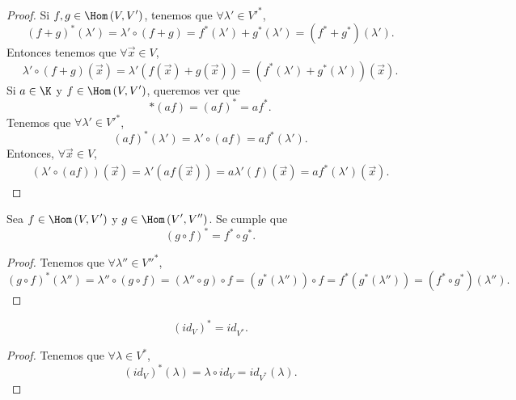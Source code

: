 \begin{proof}
Si $\displaystyle f, g \in \Hom\left(V, V'\right) $, tenemos que $\displaystyle \forall \lambda' \in V'^{*} $, 
\[\left(f+g\right)^{*}\left(\lambda'\right) = \lambda' \circ \left(f + g\right)= f^{*}\left(\lambda'\right) + g^{*}\left(\lambda'\right) = \left(f^{*}+g^{*}\right)\left(\lambda'\right) .\]
Entonces tenemos que $\displaystyle \forall \vec{x}\in V $, 
\[\lambda'\circ\left(f+g\right)\left(\vec{x}\right) = \lambda'\left(f\left(\vec{x}\right)+g\left(\vec{x}\right)\right) = \left(f^{*}\left(\lambda'\right)+g^{*}\left(\lambda'\right)\right)\left(\vec{x}\right) .\]
Si $\displaystyle a \in \K $ y $\displaystyle f \in \Hom\left(V, V'\right) $, queremos ver que
\[ *\left(af\right) = \left(af\right)^{*} = af^{*}.\]
Tenemos que $\displaystyle \forall \lambda' \in V'^{*} $, 
\[\left(af\right)^{*}\left(\lambda'\right) = \lambda' \circ \left(af\right) = a f^{*}\left(\lambda'\right) .\]
Entonces, $\displaystyle \forall \vec{x} \in V $, 
\[
\begin{split}
	\left(\lambda' \circ \left(af\right)\right)\left(\vec{x}\right) = \lambda'\left(af\left(\vec{x}\right)\right) = a \lambda'\left(f\right)\left(\vec{x}\right) = af^{*}\left(\lambda'\right)\left(\vec{x}\right) .
\end{split}
\]
\end{proof}

\begin{fprop}[]
\normalfont Sea $\displaystyle f \in \Hom\left(V, V'\right) $ y $\displaystyle g \in \Hom\left(V', V''\right) $. Se cumple que 
\[\left(g \circ f\right)^{*} = f^{*} \circ g^{*} .\]
\end{fprop}

\begin{proof}
Tenemos que $\displaystyle \forall \lambda''\in V''^{*} $, 
\[\left(g\circ f\right)^{*}\left(\lambda''\right)=\lambda''\circ\left(g\circ f\right) = \left(\lambda''\circ g\right)\circ f = \left(g^{*}\left(\lambda''\right)\right)\circ f = f^{*}\left(g^{*}\left(\lambda''\right)\right) = \left(f^{*}\circ g^{*}\right)\left(\lambda''\right) .\]
\end{proof}

\begin{fprop}[]
\normalfont 
\[\left(id _{V}\right)^{*} = id _{V^{*}} .\]
\end{fprop}

\begin{proof}
Tenemos que $\displaystyle \forall \lambda \in V^{*} $, 
\[\left(id _{V}\right)^{*}\left(\lambda\right) = \lambda \circ id _{V} = id _{V^{*}}\left(\lambda\right) .\]
\end{proof}

